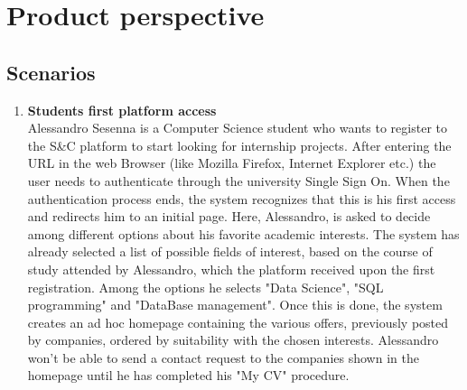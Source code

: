 \section{Product perspective}
\subsection{Scenarios}

\begin{enumerate}
      \item \textbf{Students first platform access}\\
      Alessandro Sesenna is a Computer Science student who wants to register to the S\&C platform to start looking for internship projects. After entering the URL in the web Browser (like Mozilla Firefox, Internet Explorer etc.) the user needs to authenticate through the university Single Sign On. When the authentication process ends, the system recognizes that this is his first access and redirects him to an initial page. 
      Here, Alessandro, is asked to decide among different options about his favorite academic interests. The system has already selected a list of possible fields of interest, based on the course of study attended by Alessandro, which the platform received upon the first registration. Among the options he selects "Data Science", "SQL programming" and "DataBase management". Once this is done, the system creates an ad hoc homepage containing the various offers, previously posted by companies, ordered by suitability with the chosen interests. Alessandro won't be able to send a contact request to the companies shown in the homepage until he has completed his "My CV" procedure.


\end{enumerate}
